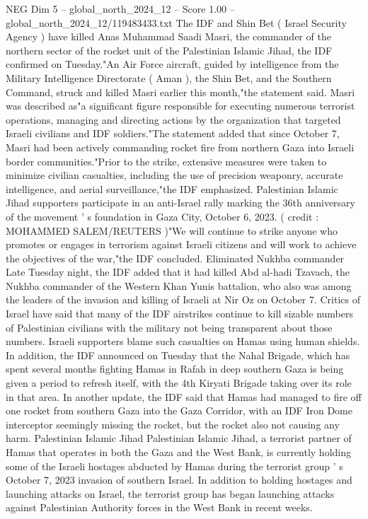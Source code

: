 \begin{textsample}{NEG Dim 5 – global\_north\_2024\_12 – Score 1.00 – global\_north\_2024\_12/119483433.txt}  \label{ex:f5_neg_339}
The IDF and Shin Bet ( Israel Security Agency ) have killed Anas Muhammad Saadi Masri, the commander of the northern sector of the rocket unit of the Palestinian Islamic Jihad, the IDF confirmed on Tuesday."An Air Force aircraft, guided by intelligence from the Military Intelligence Directorate ( Aman ), the Shin Bet, and the Southern Command, struck and killed Masri earlier this month,"the statement said.
Masri was described as"a significant figure responsible for executing numerous terrorist operations, managing and directing actions by the organization that targeted Israeli civilians and IDF soldiers."The statement added that since October 7, Masri had been actively commanding rocket fire from northern Gaza into Israeli border communities."Prior to the strike, extensive measures were taken to minimize civilian casualties, including the use of precision weaponry, accurate intelligence, and aerial surveillance,"the IDF emphasized.
Palestinian Islamic Jihad supporters participate in an anti-Israel rally marking the 36th anniversary of the movement ' s foundation in Gaza City, October 6, 2023. ( credit : MOHAMMED SALEM/REUTERS )"We will continue to strike anyone who promotes or engages in terrorism against Israeli citizens and will work to achieve the objectives of the war,"the IDF concluded.
Eliminated Nukhba commander Late Tuesday night, the IDF added that it had killed Abd al-hadi Tzavach, the Nukhba commander of the Western Khan Yunis battalion, who also was among the leaders of the invasion and killing of Israeli at Nir Oz on October 7.
Critics of Israel have said that many of the IDF airstrikes continue to kill sizable numbers of Palestinian civilians with the military not being transparent about those numbers.
Israeli supporters blame such casualties on Hamas using human shields.
In addition, the IDF announced on Tuesday that the Nahal Brigade, which has spent several months fighting Hamas in Rafah in deep southern Gaza is being given a period to refresh itself, with the 4th Kiryati Brigade taking over its role in that area.
In another update, the IDF said that Hamas had managed to fire off one rocket from southern Gaza into the Gaza Corridor, with an IDF Iron Dome interceptor seemingly missing the rocket, but the rocket also not causing any harm.
Palestinian Islamic Jihad Palestinian Islamic Jihad, a terrorist partner of Hamas that operates in both the Gaza and the West Bank, is currently holding some of the Israeli hostages abducted by Hamas during the terrorist group ' s October 7, 2023 invasion of southern Israel.
In addition to holding hostages and launching attacks on Israel, the terrorist group has began launching attacks against Palestinian Authority forces in the West Bank in recent weeks.

\end{textsample}
